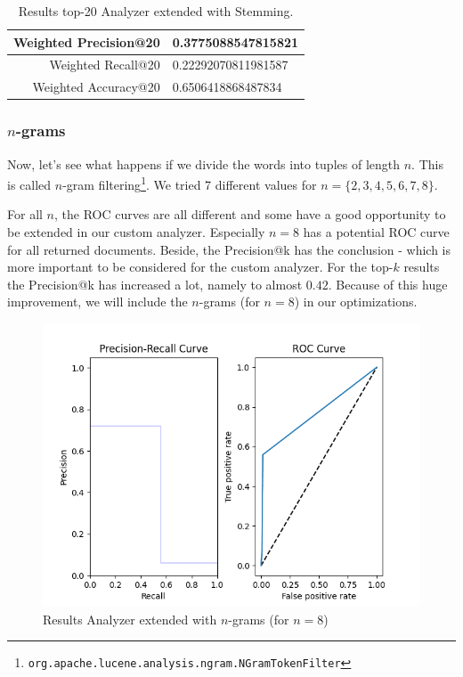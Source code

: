 \documentclass[11pt]{article}
\begin{document}
\begin{table}[htp]
	\centering
	\begin{tabular}{|r|l|}
		\hline
		Weighted \textsf{Precision@20} & 0.3775088547815821 \\ \hline
		Weighted \textsf{Recall@20} & 0.22292070811981587 \\ \hline
		Weighted \textsf{Accuracy@20} & 0.6506418868487834 \\ \hline
	\end{tabular}
	\caption{Results top-20 Analyzer extended with Stemming.}
	\label{tbl:atk-p}
\end{table}

\subsubsection{$n$-grams}\label{sec:ngrams}
Now, let's see what happens if we divide the words into tuples of length $n$. This is called $n$-gram filtering\footnote{\texttt{org.apache.lucene.analysis.ngram.NGramTokenFilter}}. We tried 7 different values for $n = \{2, 3, 4, 5, 6, 7, 8\}$.

For all $n$, the ROC curves are all different and some have a good opportunity to be extended in our custom analyzer. Especially $n=8$ has a potential ROC curve for all returned documents. Beside, the \textsf{Precision@k} has the conclusion - which is more important to be considered for the custom analyzer. For the top-$k$ results the \textsf{Precision@k} has increased a lot, namely to almost $0.42$. Because of this huge improvement, we will include the $n$-grams (for $n=8$) in our optimizations.

\begin{figure}[htp]
	\centering
	\includegraphics[width=\textwidth]{images/2ndTerm/ExclSyn_Ngram8}
	\caption{Results Analyzer extended with $n$-grams (for $n=8$)}
	\label{fig:ngram}
\end{figure}
\end{document}
